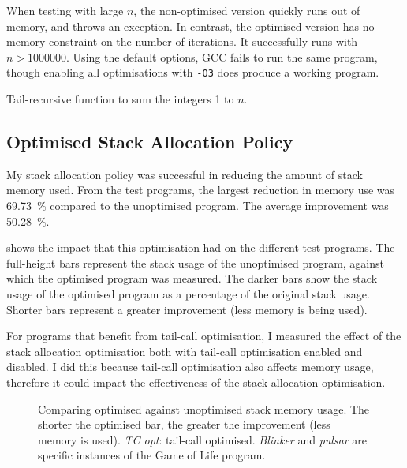\documentclass[00-main.tex]{subfiles}
\begin{document}
When testing with large $n$, the non-optimised version quickly runs out of memory, and throws an exception.
In contrast, the optimised version has no memory constraint on the number of iterations.
It successfully runs with $n > \num{1000000}$.
Using the default options, GCC fails to run the same program, though enabling all optimisations with \texttt{-O3} does produce a working program.

\begin{listing}[t]
\caption{Tail-recursive function to sum the integers 1 to $n$.\medskip}
\label{lst:tail-recursive sum}
\end{listing}


\subsection{Optimised Stack Allocation Policy}\label{sec:eval:optimised stack allocation}

My stack allocation policy was successful in reducing the amount of stack memory used.
From the test programs, the largest reduction in memory use was \SI{69.73}{\percent} compared to the unoptimised program.
The average improvement was \SI{50.28}{\percent}.

 shows the impact that this optimisation had on the different test programs.
The full-height bars represent the stack usage of the unoptimised program, against which the optimised program was measured.
The darker bars show the stack usage of the optimised program as a percentage of the original stack usage.
Shorter bars represent a greater improvement (less memory is being used).

For programs that benefit from tail-call optimisation, I measured the effect of the stack allocation optimisation both with tail-call optimisation enabled and disabled.
I did this because tail-call optimisation also affects memory usage, therefore it could impact the effectiveness of the stack allocation optimisation.

\begin{figure}[t]
  \centering
  \caption{Comparing optimised against unoptimised stack memory usage. The shorter the optimised bar, the greater the improvement (less memory is used). \emph{TC opt}: tail-call optimised. \emph{Blinker} and \emph{pulsar} are specific instances of the Game of Life program.}%
  \label{fig:comparing stack usage optimisation across programs}
\end{figure}
\end{document}
